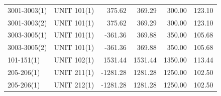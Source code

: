 \documentclass[10pt]{report}
\begin{document}
\begin{table}[H]
{\begin{tabular}{llrrrr}
3001-3003(1) & UNIT 101(1) & 375.62 & 369.29 & 300.00 & 123.10 \\
3001-3003(2) & UNIT 101(1) & 375.62 & 369.29 & 300.00 & 123.10 \\
3003-3005(1) & UNIT 101(1) & -361.36 & 369.88 & 350.00 & 105.68 \\
3003-3005(2) & UNIT 101(1) & -361.36 & 369.88 & 350.00 & 105.68 \\
101-151(1) & UNIT 102(1) & 1531.44 & 1531.44 & 1350.00 & 113.44 \\
205-206(1) & UNIT 211(1) & -1281.28 & 1281.28 & 1250.00 & 102.50 \\
205-206(1) & UNIT 212(1) & -1281.28 & 1281.28 & 1250.00 & 102.50 \\
\bottomrule
\end{tabular}}
\end{table}
\end{document}
